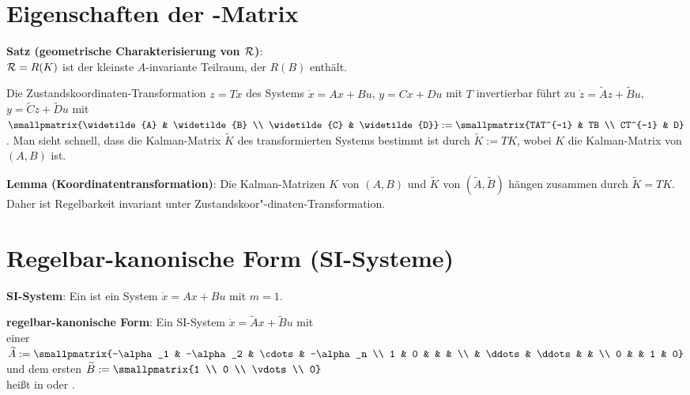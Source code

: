 \pagebreak

\section{%
    Eigenschaften der -Matrix%
}

\textbf{Satz (geometrische Charakterisierung von $\mathcal{R}$)}:\\
$\mathcal{R} = R(K)$ ist der kleinste $A$-invariante Teilraum, der $R(B)$ enthält.

\linie

Die Zustandskoordinaten-Transformation $z = Tx$ des
Systems $\dot{x} = Ax + Bu$, $y = Cx + Du$ mit $T$ invertierbar führt zu
$\dot{z} = \widetilde{A} z + \widetilde{B} u$, $y = \widetilde{C} z + \widetilde{D} u$
mit $\smallpmatrix{\widetilde{A} & \widetilde{B} \\ \widetilde{C} & \widetilde{D}}
:= \smallpmatrix{TAT^{-1} & TB \\ CT^{-1} & D}$.
Man sieht schnell, dass die Kalman-Matrix $\widetilde{K}$ des transformierten Systems
bestimmt ist durch $\widetilde{K} := TK$, wobei $K$ die Kalman-Matrix von $(A, B)$ ist.

\textbf{Lemma (Koordinatentransformation)}:
Die Kalman-Matrizen $K$ von $(A, B)$ und $\widetilde{K}$ von $(\widetilde{A}, \widetilde{B})$
hängen zusammen durch $\widetilde{K} = TK$.
Daher ist Regelbarkeit invariant unter Zustandskoor"-dinaten-Transformation.

\section{%
    Regelbar-kanonische Form (SI-Systeme)%
}

\textbf{SI-System}:
Ein  ist ein System $\dot{x} = Ax + Bu$ mit $m = 1$.

\linie

\textbf{regelbar-kanonische Form}:
Ein SI-System $\dot{x} = \widetilde{A}x + \widetilde{B}u$ mit\\
einer 
$\widetilde{A} := \smallpmatrix{-\alpha_1 & -\alpha_2 & \cdots & -\alpha_n \\
1 & 0 & & & \\ & \ddots & \ddots & & \\ 0 & & 1 & 0}$
und dem ersten  $\widetilde{B} := \smallpmatrix{1 \\ 0 \\ \vdots \\ 0}$\\
heißt in 
oder .

